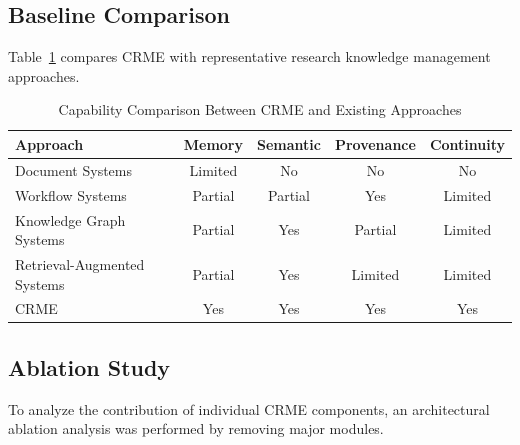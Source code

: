\subsection{Baseline Comparison}


Table~\ref{tab:baseline_comparison} compares CRME with representative
research knowledge management approaches.


\begin{table}[t]

\caption{Capability Comparison Between CRME and Existing Approaches}

\label{tab:baseline_comparison}


\centering
\small


\begin{tabular}{lcccc}

\toprule

Approach &
Memory &
Semantic &
Provenance &
Continuity
\\

\midrule


Document Systems &
Limited &
No &
No &
No
\\


Workflow Systems &
Partial &
Partial &
Yes &
Limited
\\


Knowledge Graph Systems &
Partial &
Yes &
Partial &
Limited
\\


Retrieval-Augmented Systems &
Partial &
Yes &
Limited &
Limited
\\


CRME &
Yes &
Yes &
Yes &
Yes
\\


\bottomrule

\end{tabular}


\end{table}




\subsection{Ablation Study}


To analyze the contribution of individual CRME components,
an architectural ablation analysis was performed by removing
major modules.


